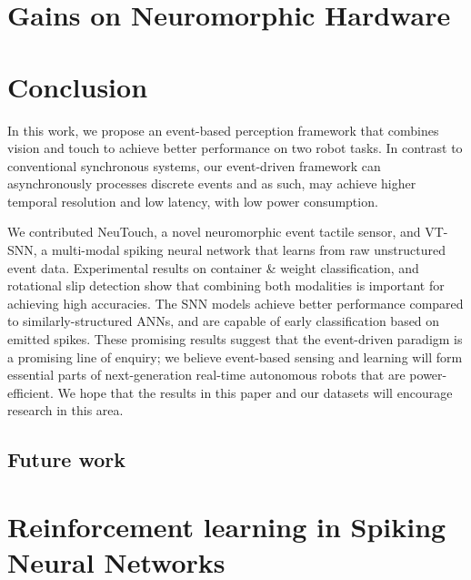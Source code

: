\documentclass[fyp]{socreport}
\begin{document}



\chapter{Gains on Neuromorphic Hardware\label{cha:neuromorphic}}

\chapter{Conclusion\label{cha:conclusion}}

In this work, we propose an event-based perception framework that combines
vision and touch to achieve better performance on two robot tasks. In contrast
to conventional synchronous systems, our event-driven framework can
asynchronously processes discrete events and as such, may achieve higher
temporal resolution and low latency, with low power consumption.

We contributed NeuTouch, a novel neuromorphic event tactile sensor, and VT-SNN,
a multi-modal spiking neural network that learns from raw unstructured event
data. Experimental results on container \& weight classification, and rotational
slip detection show that combining both modalities is important for achieving
high accuracies. The SNN models achieve better performance compared to
similarly-structured ANNs, and are capable of early classification based on
emitted spikes. These promising results suggest that the event-driven paradigm
is a promising line of enquiry; we believe event-based sensing and learning will
form essential parts of next-generation real-time autonomous robots that are
power-efficient. We hope that the results in this paper and our datasets will
encourage research in this area.

\section{Future work\label{sec:future_work}}

\chapter{Reinforcement learning in Spiking Neural Networks\label{cha:snnrl}}
\end{document}
